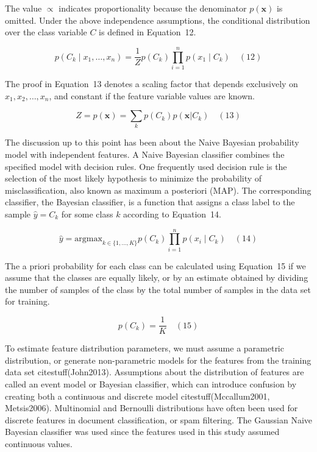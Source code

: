 \documentclass[preprint,12pt]{elsarticle}
\begin{document}
The value $\propto$ indicates proportionality because the denominator $p({\mathbf{x}})$ is omitted. Under the above independence assumptions, the conditional distribution over the class variable $C$ is defined in Equation~12.

\begin{equation}
	p(C_{k}\mid x_{1},\ldots,x_{n}) = \frac{1}{Z} p(C_{k}) \prod_{i=1}^{n} p(x_{1}\mid C_{k})
	\quad\left(12\right)
\end{equation}

The proof in Equation~13 denotes a scaling factor that depends exclusively on $x_{1}, x_{2}, \ldots, x_{n}$, and constant if the feature variable values are known.

\begin{equation}
	Z = p(\mathbf{x}) = \sum_{k} p(C_{k}) p(\mathbf{x}|C_{k})
	\quad\left(13\right)
\end{equation}

The discussion up to this point has been about the Naive Bayesian probability model with independent features. A Naive Bayesian classifier combines the specified model with decision rules. One frequently used decision rule is the selection of the most likely hypothesis to minimize the probability of misclassification, also known as maximum a posteriori (MAP). The corresponding classifier, the Bayesian classifier, is a function that assigns a class label to the sample $\hat{y} = C_{k}$ for some class $k$ according to Equation~14.

\begin{equation}
	\hat{y} = \mathrm{argmax}_{k\in \{1, \ldots, K\}} p(C_{k}) \prod_{i=1}^{n} p(x_{i}\mid C_{k})
	\quad\left(14\right)
\end{equation}

The a priori probability for each class can be calculated using Equation~15 if we assume that the classes are equally likely, or by an estimate obtained by dividing the number of samples of the class by the total number of samples in the data set for training.

\begin{equation}
	p(C_{k}) = \frac{1}{K}
	\quad\left(15\right)
\end{equation}

To estimate feature distribution parameters, we must assume a parametric distribution, or generate non-parametric models for the features from the training data set citestuff(John2013). Assumptions about the distribution of features are called an event model or Bayesian classifier, which can introduce confusion by creating both a continuous and discrete model citestuff(Mccallum2001, Metsis2006). Multinomial and Bernoulli distributions have often been used for discrete features in document classification, or spam filtering. The Gaussian Naive Bayesian classifier was used since the features used in this study assumed continuous values.
\end{document}

